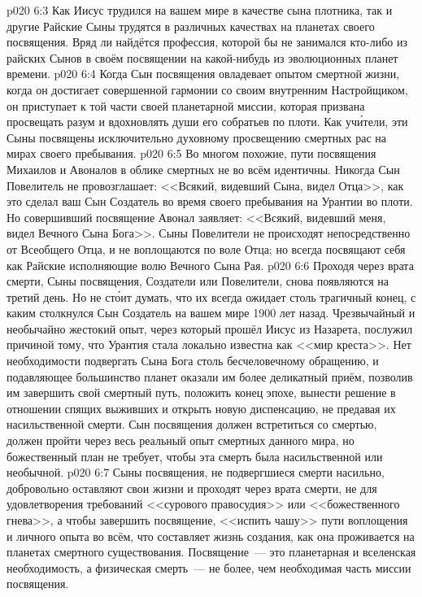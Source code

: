 \vs p020 6:3 Как Иисус трудился на вашем мире в качестве сына плотника, так и другие Райские Сыны трудятся в различных качествах на планетах своего посвящения. Вряд ли найдётся профессия, которой бы не занимался кто\hyp{}либо из райских Сынов в своём посвящении на какой\hyp{}нибудь из эволюционных планет времени.
\vs p020 6:4 Когда Сын посвящения овладевает опытом смертной жизни, когда он достигает совершенной гармонии со своим внутренним Настройщиком, он приступает к той части своей планетарной миссии, которая призвана просвещать разум и вдохновлять души его собратьев по плоти. Как уч\'ители, эти Сыны посвящены исключительно духовному просвещению смертных рас на мирах своего пребывания.
\vs p020 6:5 \pc Во многом похожие, пути посвящения Михаилов и Авоналов в облике смертных не во всём идентичны. Никогда Сын Повелитель не провозглашает: <<Всякий, видевший Сына, видел Отца>>, как это сделал ваш Сын Создатель во время своего пребывания на Урантии во плоти. Но совершивший посвящение Авонал заявляет: <<Всякий, видевший меня, видел Вечного Сына Бога>>. Сыны Повелители не происходят непосредственно от Всеобщего Отца, и не воплощаются по воле Отца; но всегда посвящают себя как Райские  исполняющие волю Вечного Сына Рая.
\vs p020 6:6 \pc Проходя через врата смерти, Сыны посвящения, Создатели или Повелители, снова появляются на третий день. Но не ст\'оит думать, что их всегда ожидает столь трагичный конец, с каким столкнулся Сын Создатель на вашем мире 1900 лет назад. Чрезвычайный и необычайно жестокий опыт, через который прошёл Иисус из Назарета, послужил причиной тому, что Урантия стала локально известна как <<мир креста>>. Нет необходимости подвергать Сына Бога столь бесчеловечному обращению, и подавляющее большинство планет оказали им более деликатный приём, позволив им завершить свой смертный путь, положить конец эпохе, вынести решение в отношении спящих выживших и открыть новую диспенсацию, не предавая их насильственной смерти. Сын посвящения должен встретиться со смертью, должен пройти через весь реальный опыт смертных данного мира, но божественный план не требует, чтобы эта смерть была насильственной или необычной.
\vs p020 6:7 Сыны посвящения, не подвергшиеся смерти насильно, добровольно оставляют свои жизни и проходят через врата смерти, не для удовлетворения требований <<сурового правосудия>> или <<божественного гнева>>, а чтобы завершить посвящение, <<испить чашу>> пути воплощения и личного опыта во всём, что составляет жизнь создания, как она проживается на планетах смертного существования. Посвящение~--- это планетарная и вселенская необходимость, а физическая смерть~--- не более, чем необходимая часть миссии посвящения.
